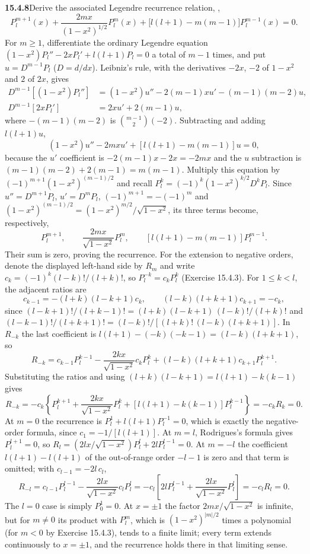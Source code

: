 \par\bigskip
\noindent\textbf{15.4.8}\quad Derive the associated Legendre recurrence
relation, ,
\[
P_{l}^{m+1}(x)+\frac{2mx}{(1-x^{2})^{1/2}}P_{l}^{m}(x)
+\big[l(l+1)-m(m-1)\big]P_{l}^{m-1}(x)=0.
\]
\solution
For $m\ge1$, differentiate the ordinary Legendre equation
$(1-x^2)P_l''-2xP_l'+l(l+1)P_l=0$ a total of $m-1$ times, and put
$u=D^{m-1}P_l$ ($D=d/dx$). Leibniz's rule, with the derivatives
$-2x$, $-2$ of $1-x^2$ and $2$ of $2x$, gives
\[
\begin{aligned}
D^{m-1}[(1-x^2)P_l'']&=(1-x^2)u''-2(m-1)xu'-(m-1)(m-2)u,\\
D^{m-1}[2xP_l']&=2xu'+2(m-1)u,
\end{aligned}
\]
where $-(m-1)(m-2)$ is $\binom{m-1}2(-2)$. Subtracting and adding
$l(l+1)u$,
\[
(1-x^2)u''-2mxu'+[l(l+1)-m(m-1)]u=0,
\]
because the $u'$ coefficient is $-2(m-1)x-2x=-2mx$ and the $u$
subtraction is $(m-1)(m-2)+2(m-1)=m(m-1)$.
Multiply this equation by $(-1)^{m+1}(1-x^2)^{(m-1)/2}$ and recall
$P_l^k=(-1)^k(1-x^2)^{k/2}D^kP_l$. Since $u''=D^{m+1}P_l$, $u'=D^mP_l$,
$(-1)^{m+1}=-(-1)^m$ and $(1-x^2)^{(m-1)/2}=(1-x^2)^{m/2}/\sqrt{1-x^2}$,
its three terms become, respectively,
\[
P_l^{m+1},\qquad
\frac{2mx}{\sqrt{1-x^2}}P_l^m,\qquad
[l(l+1)-m(m-1)]P_l^{m-1}.
\]
Their sum is zero, proving the recurrence.
For the extension to negative orders, denote the displayed left-hand
side by $R_m$ and write
$c_k=(-1)^k(l-k)!/(l+k)!$, so $P_l^{-k}=c_kP_l^k$ (Exercise 15.4.3).
For $1\le k<l$, the adjacent ratios are
\[
c_{k-1}=-(l+k)(l-k+1)c_k,\qquad
(l-k)(l+k+1)c_{k+1}=-c_k,
\]
since $(l-k+1)!/(l+k-1)!=(l+k)(l-k+1)\,(l-k)!/(l+k)!$ and
$(l-k-1)!/(l+k+1)!=(l-k)!/[(l+k)!\,(l-k)(l+k+1)]$.
In $R_{-k}$ the last coefficient is
$l(l+1)-(-k)(-k-1)=(l-k)(l+k+1)$, so
\[
R_{-k}=c_{k-1}P_l^{k-1}-\frac{2kx}{\sqrt{1-x^2}}c_kP_l^k
+(l-k)(l+k+1)c_{k+1}P_l^{k+1}.
\]
Substituting the ratios and using
$(l+k)(l-k+1)=l(l+1)-k(k-1)$ gives
\[
R_{-k}=-c_k\left\{P_l^{k+1}+\frac{2kx}{\sqrt{1-x^2}}P_l^k
+[l(l+1)-k(k-1)]P_l^{k-1}\right\}=-c_kR_k=0.
\]
At $m=0$ the recurrence is $P_l^1+l(l+1)P_l^{-1}=0$,
which is exactly the negative-order formula, since
$c_1=-1/[l(l+1)]$. At $m=l$, Rodrigues's formula gives $P_l^{l+1}=0$,
so $R_l=(2lx/\sqrt{1-x^2})P_l^l+2lP_l^{l-1}=0$. At $m=-l$ the
coefficient $l(l+1)-l(l+1)$ of the out-of-range order $-l-1$ is zero
and that term is omitted; with $c_{l-1}=-2l\,c_l$,
\[
R_{-l}=c_{l-1}P_l^{l-1}-\frac{2lx}{\sqrt{1-x^2}}c_lP_l^l
=-c_l\left[2lP_l^{l-1}+\frac{2lx}{\sqrt{1-x^2}}P_l^l\right]
=-c_lR_l=0.
\]
The $l=0$ case is simply $P_0^1=0$.
At $x=\pm1$ the factor $2mx/\sqrt{1-x^2}$ is infinite, but for $m\ne0$
its product with $P_l^m$, which is $(1-x^2)^{|m|/2}$ times a polynomial
(for $m<0$ by Exercise 15.4.3), tends to a finite limit; every term
extends continuously to $x=\pm1$, and the recurrence holds there in
that limiting sense.

